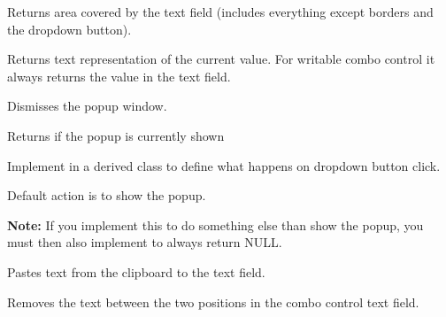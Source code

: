 
Returns area covered by the text field (includes everything except
borders and the dropdown button).


\label{wxcomboctrlgetvalue}


Returns text representation of the current value. For writable
combo control it always returns the value in the text field.


\label{wxcomboctrlhidepopup}


Dismisses the popup window.


\label{wxcomboctrlispopupshown}


Returns \true if the popup is currently shown


\label{wxcomboctrlonbuttonclick}


Implement in a derived class to define what happens on
dropdown button click.

Default action is to show the popup.

\textbf{Note:} If you implement this to do something else than
show the popup, you must then also implement
 to always
return NULL.


\label{wxcomboctrlpaste}


Pastes text from the clipboard to the text field.


\label{wxcomboctrlremove}


Removes the text between the two positions in the combo control text field.





\label{wxcomboctrlreplace}

